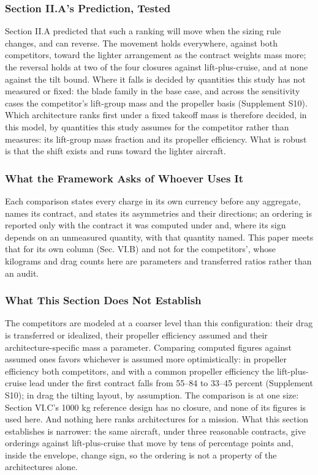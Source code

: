 \documentclass[journal]{new-aiaa}
\begin{document}
\subsubsection{Section II.A's Prediction, Tested}

Section II.A predicted that such a ranking will move when the sizing rule changes, and can reverse. The movement holds everywhere, against both competitors, toward the lighter arrangement as the contract weights mass more; the reversal holds at two of the four closures against lift-plus-cruise, and at none against the tilt bound. Where it falls is decided by quantities this study has not measured or fixed: the blade family in the base case, and across the sensitivity cases the competitor's lift-group mass and the propeller basis (Supplement S10). Which architecture ranks first under a fixed takeoff mass is therefore decided, in this model, by quantities this study assumes for the competitor rather than measures: its lift-group mass fraction and its propeller efficiency. What is robust is that the shift exists and runs toward the lighter aircraft.

\subsubsection{What the Framework Asks of Whoever Uses It}

Each comparison states every charge in its own currency before any aggregate, names its contract, and states its asymmetries and their directions; an ordering is reported only with the contract it was computed under and, where its sign depends on an unmeasured quantity, with that quantity named. This paper meets that for its own column (Sec. VI.B) and not for the competitors', whose kilograms and drag counts here are parameters and transferred ratios rather than an audit.

\subsubsection{What This Section Does Not Establish}

The competitors are modeled at a coarser level than this configuration: their drag is transferred or idealized, their propeller efficiency assumed and their architecture-specific mass a parameter. Comparing computed figures against assumed ones favors whichever is assumed more optimistically: in propeller efficiency both competitors, and with a common propeller efficiency the lift-plus-cruise lead under the first contract falls from 55--84 to 33--45 percent (Supplement S10); in drag the tilting layout, by assumption. The comparison is at one size: Section VI.C's 1000 kg reference design has no closure, and none of its figures is used here. And nothing here ranks architectures for a mission. What this section establishes is narrower: the same aircraft, under three reasonable contracts, give orderings against lift-plus-cruise that move by tens of percentage points and, inside the envelope, change sign, so the ordering is not a property of the architectures alone.
\end{document}
